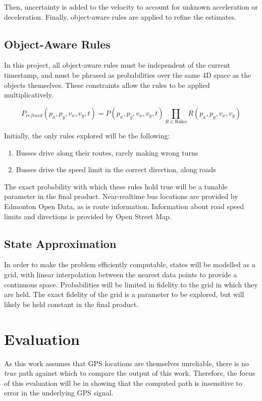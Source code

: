 \documentclass{article}
\begin{document}
Then, uncertainty is added to the velocity to account for unknown acceleration or deceleration.
Finally, object-aware rules are applied to refine the estimates.

\subsection{Object-Aware Rules}

In this project, all object-aware rules must be independent of the current timestamp, and must be phrased as probabilities over the same 4D space as the objects themselves. These constraints allow the rules to be applied multiplicatively.

\begin{equation}
  P_{refined}(p_x, p_y, v_x, v_y, t) = P(p_x, p_y, v_x, v_y, t) \prod_{R \in \text{Rules}} R(p_x, p_y, v_x, v_y)
\end{equation}

Initially, the only rules explored will be the following:
\begin{enumerate}
    \item Busses drive along their routes, rarely making wrong turns
    \item Busses drive the speed limit in the correct direction, along roads
\end{enumerate}

The exact probability with which these rules hold true will be a tunable parameter in the final product.
Near-realtime bus locations are provided by Edmonton Open Data, as is route information. Information about road speed limits and directions is provided by Open Street Map.


\subsection{State Approximation}
In order to make the problem efficiently computable, states will be modelled as a grid, with linear interpolation between the nearest data points to provide a continuous space.
Probabilities will be limited in fidelity to the grid in which they are held. The exact fidelity of the grid is a parameter to be explored, but will likely be held constant in the final product.

\section{Evaluation}
As this work assumes that GPS locations are themselves unreliable, there is no \textit{true} path against which to compare the output of this work. Therefore, the focus of this evaluation will be in showing that the computed path is insensitive to error in the underlying GPS signal.
\end{document}

